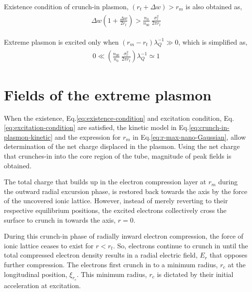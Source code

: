 \documentclass[aps,twocolumn,notitlepage,superscriptaddress]{revtex4-1}
\begin{document}
Existence condition of crunch-in plasmon,  $(r_t+\Delta w)>r_m$ is also obtained as,
\begin{align}\label{eq:existence-condition}
\begin{split} 
\Delta w \left(1+\frac{\Delta w}{2r_t}\right) > \frac{n_0}{n_{b0}} ~ \frac{\sigma_r^2}{2\pi r_t}
\end{split}
\end{align}

Extreme plasmon is excited only when $(r_m - r_t)\lambda_Q^{-1}\gg 0$, which is simplified as,
\begin{align}\label{eq:excitation-condition}
\begin{split}
0\ll\left( \frac{n_{b0}}{n_0} ~ \frac{\sigma_r^2}{2\pi r_t} \right) \lambda_Q^{-1} \simeq 1
 \end{split}
\end{align}

\section{Fields of the extreme plasmon}
\label{sec:field-estimation}

When the existence, Eq.\ref{eq:existence-condition} and excitation condition, Eq.\ref{eq:excitation-condition} are satisfied, the kinetic model in Eq.\ref{eq:crunch-in-plasmon-kinetic} and the expression for $r_m$ in Eq.\ref{eq:r-max-nano-Gaussian}, allow determination of the net charge displaced in the plasmon. Using the net charge that crunches-in into the core region of the tube, magnitude of peak fields is obtained.

The total charge that builds up in the electron compression layer at $r_m$ during the outward radial excursion phase, is restored back towards the axis by the force of the uncovered ionic lattice. However, instead of merely reverting to their respective equilibrium positions, the excited electrons collectively cross the surface to crunch in towards the axis, $r=0$. 

During this crunch-in phase of radially inward electron compression, the force of ionic lattice ceases to exist for $r < r_t$. So, electrons continue to crunch in until the total compressed electron density results in a radial electric field, $E_r$ that opposes further compression. The electrons first crunch in to a minimum radius, $r_{c}$ at the longitudinal position, $\xi_{r_c}$. This minimum radius, $r_{c}$ is dictated by their initial acceleration at excitation.
\end{document}
